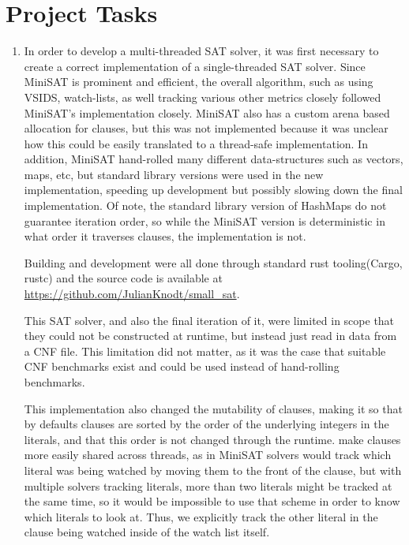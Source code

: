 \documentclass[11pt]{extarticle}
\begin{document}
\section*{Project Tasks}
\begin{enumerate}
\item
In order to develop a multi-threaded SAT solver, it was first necessary to create a correct
implementation of a single-threaded SAT solver. Since MiniSAT is prominent and efficient, the
overall algorithm, such as using VSIDS, watch-lists, as well tracking various other metrics
closely followed MiniSAT's implementation closely. MiniSAT also has a custom arena based
allocation for clauses, but this was not
implemented because it was unclear how this could be easily translated to a thread-safe
implementation. In addition, MiniSAT hand-rolled many different data-structures such as vectors,
maps, etc, but standard library versions were used in the new implementation, speeding up
development but possibly slowing down the final implementation. Of note, the standard library
version of HashMaps do not guarantee iteration order, so while the MiniSAT version is
deterministic in what order it traverses clauses, the implementation is not.

Building and development were all done through standard rust tooling(Cargo, rustc) and the
source code is available at \url{https://github.com/JulianKnodt/small_sat}.

This SAT solver, and also the final iteration of it, were limited in scope that they
could not be constructed at runtime, but instead just read in data from a CNF file\cite{cnf}.
This limitation did not matter, as it was the case that suitable CNF benchmarks exist and could
be used instead of hand-rolling benchmarks.

This implementation also changed the mutability of clauses, making it so that by defaults
clauses are sorted by the order of the underlying integers in the literals, and that this order
is not changed through the runtime.
make clauses more easily shared across threads, as in MiniSAT solvers would track which literal
was being watched by moving them to the front of the clause, but with multiple solvers tracking
literals, more than two literals might be tracked at the same time, so it would be impossible to
use that scheme in order to know which literals to look at. Thus, we explicitly track the other
literal in the clause being watched inside of the watch list itself.


\end{enumerate}
\end{document}

